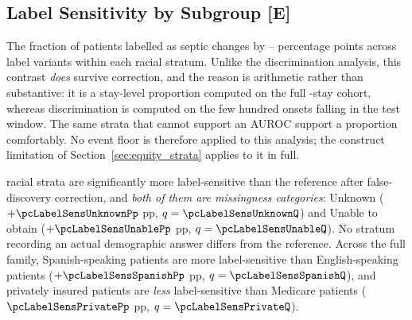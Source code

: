 \subsection{Label Sensitivity by Subgroup \texorpdfstring{[E]}{[E]}}
\label{sec:label_sens_subgroup}

\begin{table}[H]
    \centering\footnotesize
    \caption{Percentage of stays labelled as septic by racial subgroup and label
    variant, with a 95\% stratified cluster-bootstrap interval on the A--C
    range. The fraction roughly doubles from Variant A to C across all groups.
    Per-variant intervals are in \texttt{12\_subgroup\_labelsens\_ci.csv}.
    \textbf{[E] exploratory.}}
    \label{tab:equity_label}
\end{table}

The fraction of patients labelled as septic changes by
\pcLabelSensRangeLo--\pcLabelSensRangeHi{} percentage points across label
variants within each racial stratum. Unlike the discrimination analysis, this
contrast \emph{does} survive correction, and the reason is arithmetic rather
than substantive: it is a stay-level proportion computed on the full
\pcNStays{}-stay cohort, whereas discrimination is computed on the few hundred
onsets falling in the test window. The same strata that cannot support an AUROC
support a proportion comfortably. No event floor is therefore applied to this
analysis; the construct limitation of Section~\ref{sec:equity_strata} applies to
it in full.

\begin{table}[H]
    \centering\footnotesize
    \caption{Difference in label sensitivity (A--C range) against the reference
    group (White). $q_{\text{BH}}$ is adjusted over exploratory family E2, all
    18 label-sensitivity contrasts across race, language and insurance. Two
    racial contrasts survive at $q < 0.05$; across the full family,
    \pcLabelSensNSig{} do (adding Spanish-speaking patients,
    $+\pcLabelSensSpanishPp$ pp, $q = \pcLabelSensSpanishQ$, and privately
    insured patients, $\pcLabelSensPrivatePp$ pp,
    $q = \pcLabelSensPrivateQ$). \textbf{[E] exploratory.}}
    \label{tab:equity_label_contrasts}
\end{table}

\pcLabelSensNSigRace{} racial strata are significantly more label-sensitive
than the reference after false-discovery correction, and \emph{both of them are
missingness categories}: Unknown ($+\pcLabelSensUnknownPp$ pp,
$q = \pcLabelSensUnknownQ$) and Unable to obtain ($+\pcLabelSensUnablePp$ pp,
$q = \pcLabelSensUnableQ$). No stratum recording an actual demographic answer
differs from the reference. Across the full family, Spanish-speaking patients
are more label-sensitive than English-speaking patients
($+\pcLabelSensSpanishPp$ pp, $q = \pcLabelSensSpanishQ$), and privately
insured patients are \emph{less} label-sensitive than Medicare patients
($\pcLabelSensPrivatePp$ pp, $q = \pcLabelSensPrivateQ$).

